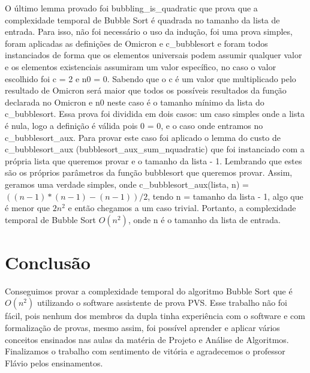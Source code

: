 \documentclass[12pt]{article}
\begin{document}
O último lemma provado foi bubbling\_is\_quadratic que prova que a complexidade temporal de Bubble Sort é quadrada no tamanho da lista de entrada. Para isso, não foi necessário o uso da indução, foi uma prova simples, foram aplicadas as definições de Omicron e c\_bubblesort e foram todos instanciados de forma que os elementos universais podem assumir qualquer valor e os elementos existenciais assumiram um valor específico, no caso o valor escolhido foi c = 2 e n0 = 0. Sabendo que o c é um valor que multiplicado pelo resultado de Omicron será maior que todos os possíveis resultados da função declarada no Omicron e n0 neste caso é o tamanho mínimo da lista do c\_bubblesort. Essa prova foi dividida em dois casos: um caso simples onde a lista é nula, logo a definição é válida pois 0 = 0, e o caso onde entramos no c\_bubblesort\_aux. Para provar este caso foi aplicado o lemma do custo de c\_bubblesort\_aux (bubblesort\_aux\_sum\_nquadratic) que foi instanciado com a própria lista que queremos provar e o tamanho da lista - 1. Lembrando que estes são os próprios parâmetros da função bubblesort que queremos provar. Assim, geramos uma verdade simples, onde c\_bubblesort\_aux(lista, n) = $(( n - 1 ) * ( n - 1) - (n - 1) ) / 2$, tendo n = tamanho da lista - 1, algo que é menor que $2n^{2}$ e então chegamos a um caso trivial. Portanto, a complexidade temporal de Bubble Sort $O(n^2)$, onde n é o tamanho da lista de entrada.

\section{Conclusão}
Conseguimos provar a complexidade temporal do algoritmo Bubble Sort que é $O(n^2)$ utilizando o software assistente de prova PVS. Esse trabalho não foi fácil, pois nenhum dos membros da dupla tinha experiência com o software e com formalização de provas, mesmo assim, foi possível aprender e aplicar vários conceitos ensinados nas aulas da matéria de Projeto e Análise de Algoritmos. Finalizamos o trabalho com sentimento de vitória e agradecemos o professor Flávio pelos ensinamentos. 
\end{document}
